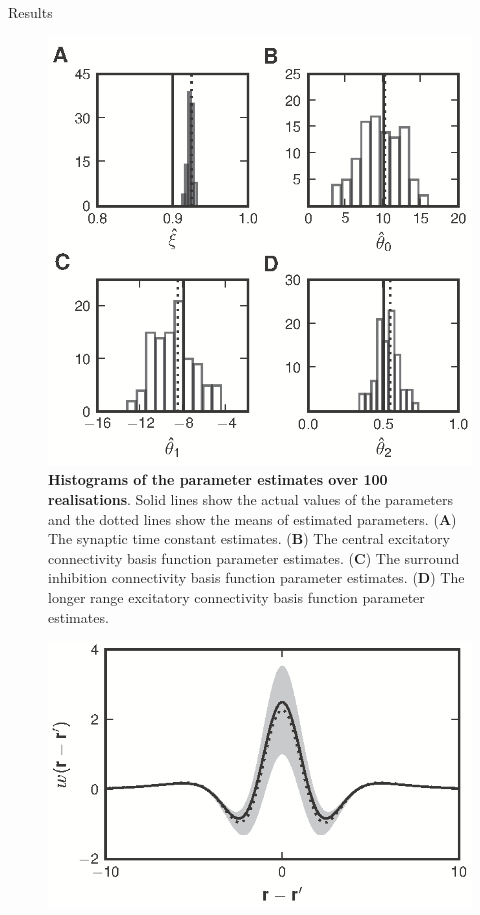 \documentclass[final]{beamer}
\newlength{\onecolwid}
\begin{document}
\begin{frame}[t]
\begin{columns}[t]
\begin{column}{\onecolwid}
      			  
      \begin{block}{Results}
		\begin{figure}	
		\begin{center}
		  \includegraphics[width=7in, scale = 10]{Figure7.eps}
		\end{center}
		\caption{{\bf Histograms of the parameter estimates over 100
		realisations}. Solid lines show the actual values of the parameters and the dotted lines show the means of estimated parameters. (\textbf{A}) The synaptic time constant estimates. (\textbf{B}) The central excitatory connectivity basis function parameter estimates. (\textbf{C}) The surround inhibition connectivity basis function parameter estimates. (\textbf{D}) The longer range excitatory connectivity basis function parameter estimates.} 
		\label{fig:Figure7}	
		\end{figure}
		\begin{figure}
		\begin{center}
		\includegraphics[width=7in, scale = 10]{Figure8.eps}

\end{center}
\end{figure}
\end{block}
\end{column}
\end{columns}
\end{frame}
\end{document}
